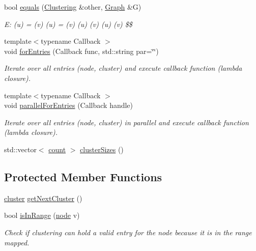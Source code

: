 \begin{DoxyCompactItemize}
bool \hyperlink{class_networ_kit_1_1_clustering_a6d544799c96254b1ec6600b1b23c0fe7}{equals} (\hyperlink{class_networ_kit_1_1_clustering}{Clustering} \&other, \hyperlink{class_networ_kit_1_1_graph}{Graph} \&G)
\begin{DoxyCompactList}\small\item\em E\-: (u) = (v)  (u) = (v)  (u)  (v)  (u)  (v) \$\$ \end{DoxyCompactList}\item 
{\footnotesize template$<$typename Callback $>$ }\\void \hyperlink{class_networ_kit_1_1_clustering_ae8609ce296db036c934efd02aeab8b53}{for\-Entries} (Callback func, std\-::string par=\char`\"{}\char`\"{})
\begin{DoxyCompactList}\small\item\em Iterate over all entries (node, cluster) and execute callback function (lambda closure). \end{DoxyCompactList}\item 
{\footnotesize template$<$typename Callback $>$ }\\void \hyperlink{class_networ_kit_1_1_clustering_a355a49ca8f9d3db188bed8f0812e6e79}{parallel\-For\-Entries} (Callback handle)
\begin{DoxyCompactList}\small\item\em Iterate over all entries (node, cluster) in parallel and execute callback function (lambda closure). \end{DoxyCompactList}\item 
std\-::vector$<$ \hyperlink{namespace_networ_kit_ad4c536a5339a8bf2f91f418b9a67a7d8}{count} $>$ \hyperlink{class_networ_kit_1_1_clustering_ae9b0dbc21c92389e470ea004a726db43}{cluster\-Sizes} ()
\end{DoxyCompactItemize}
\subsection*{Protected Member Functions}
\begin{DoxyCompactItemize}
\item 
\hyperlink{namespace_networ_kit_aee72806475c8d37642866ab18aceab8b}{cluster} \hyperlink{class_networ_kit_1_1_clustering_a4a6048b511cd71139d048150e99096b1}{get\-Next\-Cluster} ()
\item 
bool \hyperlink{class_networ_kit_1_1_clustering_a734d01f0dc90fcd782dfb2f72aecc9f4}{is\-In\-Range} (\hyperlink{namespace_networ_kit_a61914158fd771265be48de9942369160}{node} v)
\begin{DoxyCompactList}\small\item\em Check if clustering can hold a valid entry for the node because it is in the range mapped. \end{DoxyCompactList}\end{DoxyCompactItemize}

